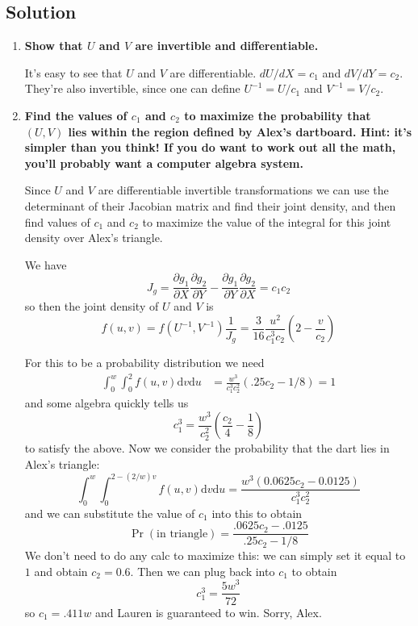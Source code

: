 \documentclass{article}
\newcommand{\dd}[1]{\mathrm{d}#1}
\begin{document}
\subsection{Solution}

\begin{enumerate}[label=(\alph*)]
    \item \textbf{Show that $U$ and $V$ are invertible and differentiable.}

    It's easy to see that $U$ and $V$ are differentiable. $dU/dX = c_1$ and
    $dV/dY = c_2$. They're also invertible, since one can define $U^{-1} = U / c_1$
    and $V^{-1} = V / c_2$.

    \vspace{2cm}
    
    \item \textbf{Find the values of $c_1$ and $c_2$ to maximize the probability that $(U,V)$
    lies within the region defined by Alex's dartboard. Hint: it's simpler than you think!
    If you do want to work out all the math, you'll probably want a computer algebra system.}

    Since $U$ and $V$ are differentiable invertible transformations we can
    use the determinant of their Jacobian matrix and find their joint density,
    and then find values of $c_1$ and $c_2$ to maximize the value of the integral
    for this joint density over Alex's triangle.

    We have 
    \[
        J_g = \frac{\partial g_1}{\partial X}\frac{\partial g_2}{\partial Y} - \frac{\partial g_1}{\partial Y}\frac{\partial g_2}{\partial X} = c_1 c_2
    \]
    so then the joint density of $U$ and $V$ is 
    \[
    f(u,v) = f(U^{-1},V^{-1})\frac{1}{J_g} = \frac{3}{16}\frac{u^2}{c_1^3 c_2}\left(2-\frac{v}{c_2}\right)
    \]

    For this to be a probability distribution we need
    \[
        \begin{aligned}
            \int_{0}^{w}\int_{0}^{2} f(u,v) \dd v \dd u &= \frac{w^3}{c_1^3 c_2^2}(.25c_2 - 1/8) = 1
        \end{aligned}
    \]
    and some algebra quickly tells us
    \[
        c_1^3 = \frac{w^3}{c_2^2}\left(\frac{c_2}{4} - \frac{1}{8}\right)
    \]
    to satisfy the above. Now we consider the probability that the dart lies in
    Alex's triangle:
    \[
        \int_{0}^w\int_{0}^{2 - (2/w)v}f(u,v) \dd v \dd u = \frac{w^3 (0.0625c_2 - 0.0125)}{c_1^3 c_2^2}
    \]
    and we can substitute the value of $c_1$ into this to obtain
    \[
        \Pr (\text{in triangle}) = \frac{.0625c_2 - .0125}{.25c_2 - 1/8}
    \]
    We don't need to do any calc to maximize this: we can simply set it equal to $1$
    and obtain $c_2 = 0.6$. Then we can plug back into $c_1$ to obtain
    \[
        c_1^3 = \frac{5w^3}{72}
    \]
    so $c_1 = .411w$ and Lauren is guaranteed to win. Sorry, Alex.


\end{enumerate}
\end{document}
